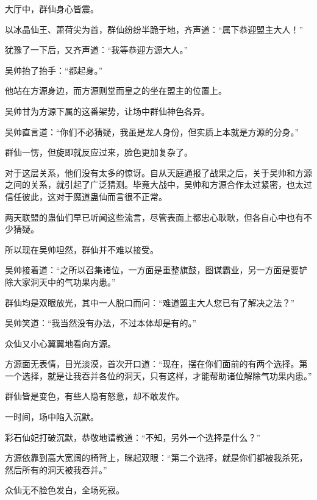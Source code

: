 \begin{this_body}
大厅中，群仙身心皆震。

以冰晶仙王、萧荷尖为首，群仙纷纷半跪于地，齐声道：“属下恭迎盟主大人！”

犹豫了一下后，又齐声道：“我等恭迎方源大人。”

吴帅抬了抬手：“都起身。”

他站在方源身边，而方源则堂而皇之的坐在盟主的位置上。

吴帅甘为方源下属的这番架势，让场中群仙神色各异。

吴帅直言道：“你们不必猜疑，我虽是龙人身份，但实质上本就是方源的分身。”

群仙一愣，但旋即就反应过来，脸色更加复杂了。

对于这层关系，他们没有太多的惊讶。自从天庭通报了战果之后，关于吴帅和方源之间的关系，就引起了广泛猜测。毕竟大战中，吴帅和方源合作太过紧密，也太过信任彼此，这对于魔道蛊仙而言很不正常。

两天联盟的蛊仙们早已听闻这些流言，尽管表面上都忠心耿耿，但各自心中也有不少猜疑。

所以现在吴帅坦然，群仙并不难以接受。

吴帅接着道：“之所以召集诸位，一方面是重整旗鼓，图谋霸业，另一方面是要铲除大家洞天中的气功果内患。”

群仙均是双眼放光，其中一人脱口而问：“难道盟主大人您已有了解决之法？”

吴帅笑道：“我当然没有办法，不过本体却是有的。”

众仙又小心翼翼地看向方源。

方源面无表情，目光淡漠，首次开口道：“现在，摆在你们面前的有两个选择。第一个选择，就是让我吞并各位的洞天，只有这样，才能帮助诸位解除气功果内患。”

群仙皆是变色，有些人隐有怒意，却不敢发作。

一时间，场中陷入沉默。

彩石仙妃打破沉默，恭敬地请教道：“不知，另外一个选择是什么？”

方源依靠到高大宽阔的椅背上，眯起双眼：“第二个选择，就是你们都被我杀死，然后所有的洞天被我吞并。”

众仙无不脸色发白，全场死寂。

\end{this_body}

